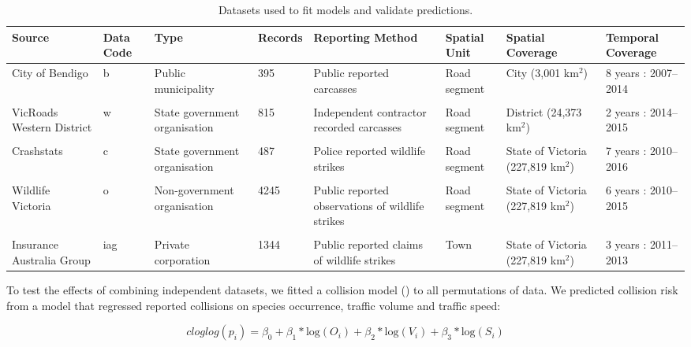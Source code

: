 \begin{table}[!t]
\caption[Datasets used to fit collision models and validate predictions]{Datasets used to fit models and validate predictions.}
\centering
\begin{tabularx}{0.9\textwidth}{YYYYYYYY} \toprule
Source						&Data Code	&Type	&Records	&Reporting Method	&Spatial Unit	&Spatial Coverage	&Temporal Coverage \\ \midrule

City of Bendigo		&b		&Public municipality			&395		&Public reported carcasses			&Road segment		&City (3,001 km$^2$)	&8 years : 2007--2014 \\

&&&&&&\\

VicRoads Western District	&w		&State government organisation	&815		&Independent contractor recorded  carcasses			&Road segment		&District (24,373 km$^2$)	&2 years : 2014--2015 \\

&&&&&&\\

Crashstats		&c			&State government organisation	&487		&Police reported wildlife strikes			&Road segment		&State of Victoria (227,819 km$^2$)	&7 years : 2010--2016 \\

&&&&&&\\

Wildlife Victoria	&o		&Non-government organisation	&4245		&Public reported observations of wildlife strikes			&Road segment		&State of Victoria (227,819 km$^2$)	&6 years : 2010--2015 \\

&&&&&&\\

Insurance Australia Group	&iag	&Private corporation			&1344		&Public reported claims of wildlife strikes			&Town		&State of Victoria (227,819 km$^2$)	&3 years : 2011--2013 \\

\bottomrule
\end{tabularx}
\label{val_data}
\end{table}

To test the effects of combining independent datasets, we fitted a collision model () to all permutations of data.  We predicted collision risk from a model that regressed reported collisions on species occurrence, traffic volume and traffic speed:

\begin{equation} \label{eq:61}
cloglog(p_i) = \beta_0 + \beta_1*\text{log}(O_i) + \beta_2*\text{log}(V_i) + \beta_3*\text{log}(S_i)
\end{equation}

